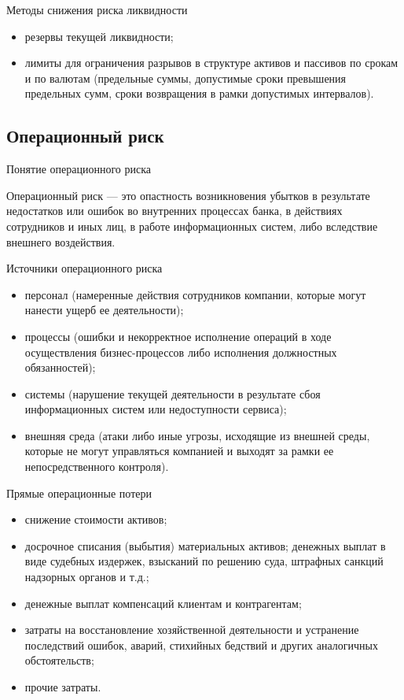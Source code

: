 \documentclass[financial_risks_lectures.tex]{subfiles}
\begin{document}
\begin{frame}{Методы снижения риска ликвидности}
\begin{itemize}[<+->]
\item
резервы текущей ликвидности;
\item
лимиты для ограничения разрывов в структуре активов и пассивов по срокам и по валютам (предельные суммы, допустимые сроки превышения предельных сумм, сроки возвращения в рамки допустимых интервалов).
\end{itemize}
\end{frame}


\subsection{Операционный риск}
\begin{frame}{Понятие операционного риска}
\begin{block}{Операционный риск}
\quad — это опастность возникновения убытков в результате недостатков или ошибок во внутренних процессах банка, в действиях сотрудников и иных лиц, в работе информационных систем, либо вследствие внешнего воздействия.
\end{block}
\end{frame}

\begin{frame}{Источники операционного риска}
\begin{itemize}[<+->]
\item
персонал (намеренные действия сотрудников компании, которые могут нанести ущерб ее деятельности);
\item
процессы (ошибки и некорректное исполнение операций в ходе осуществления бизнес-процессов либо исполнения должностных обязанностей);
\item
системы (нарушение текущей деятельности в результате сбоя информационных систем или недоступности сервиса);
\item
внешняя среда (атаки либо иные угрозы, исходящие из внешней среды, которые не могут управляться компанией и выходят за рамки ее непосредственного контроля).
\end{itemize}
\end{frame}

\begin{frame}{Прямые операционные потери}
\begin{itemize}[<+->]
\item
снижение стоимости активов;
\item
досрочное списания (выбытия) материальных активов;
денежных выплат в виде судебных издержек, взысканий по решению суда, штрафных санкций надзорных органов и т.д.;
\item
денежные выплат компенсаций клиентам и контрагентам;
\item
затраты на восстановление хозяйственной деятельности и устранение последствий ошибок, аварий, стихийных бедствий и других аналогичных обстоятельств;
\item
прочие затраты.
\end{itemize}
\end{frame}
\end{document}
